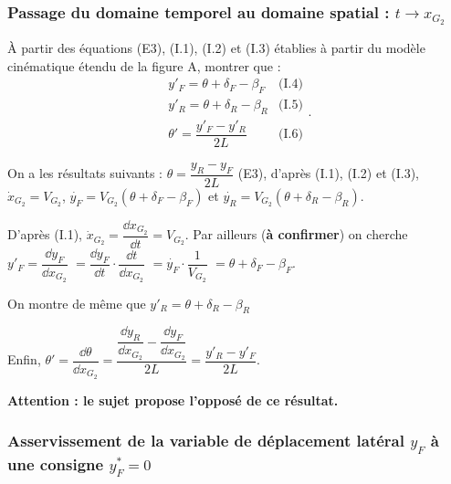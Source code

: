 \documentclass[11pt]{article}
\begin{document}
\subsubsection{Passage du domaine temporel au domaine spatial : $t\to x_{G_2}$}





\UPSTIquestion À partir des équations (E3), (I.1), (I.2) et (I.3) établies à partir du modèle cinématique étendu de la
figure A, montrer que : 
$$ \begin{array}{lr}
y'_F = \theta + \delta_F-\beta_F   & \text{(I.4)} \\
y'_R = \theta + \delta_R-\beta_R  & \text{(I.5)}\\
\theta'=\dfrac{y'_F-y'_R}{2L}       & \text{(I.6)}
\end{array}.$$

\begin{UPSTIcorrige}


On a les résultats suivants :  $  \theta = \dfrac{ y_{R} - y_F}{2L }$ (E3), d'après  (I.1), (I.2) et (I.3), $\dot{x}_{G_2}=V_{G_2}$, $\dot{y_F}=V_{G_2}\left(\theta + \delta_F - \beta_F\right)$ et  $\dot{y_R}=V_{G_2}\left(\theta + \delta_R - \beta_R\right)$. 


D'après (I.1), $\dot{x}_{G_2}= \dfrac{\dd x_{G_2}}{\dd t} =  V_{G_2}$.
Par ailleurs (\textbf{à confirmer}) on cherche $y'_F=\dfrac{\dd y_F}{\dd x_{G_2}} $ 
$= \dfrac{\dd y_F}{\dd t}  \cdot \dfrac{\dd  t}{\dd x_{G_2}}$ 
$ =\dot{y_F}\cdot \dfrac{1}{V_{G_2}}$ 
$ =\theta + \delta_F - \beta_F$.

On montre de même que $y'_R = \theta + \delta_R-\beta_R$

Enfin, $\theta' = \dfrac{\dd \theta}{\dd x_{G_2}}=\dfrac{ \dfrac{\dd y_{R}}{\dd x_{G_2}} - \dfrac{\dd y_F}{\dd x_{G_2}}}{2L } = \dfrac{y'_R-y'_F}{2L}$.

\textbf{Attention : le sujet propose l'opposé de ce résultat.}

\end{UPSTIcorrige}

\subsubsection{Asservissement de la variable de déplacement latéral $y_F$ à une consigne $y^*_F=0$}
\end{document}

